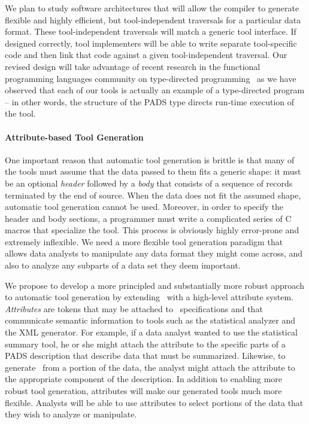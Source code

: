 \documentclass[11pt]{article}
\begin{document}
We plan to study software architectures that will allow the compiler to generate
flexible and highly efficient, but tool-independent traversals for a particular data format.  
These tool-independent traversals will match a generic tool interface.  If designed correctly, 
tool implementers will be able to write separate tool-specific code and then link that code
against a given tool-independent traversal.  Our revised design will take advantage of
recent research in the functional programming languages community on type-directed 
programming~\cite{crary+:intensional-types,LPJ03,syb2,SYB3}
as we have observed that each of our tools is actually an example 
of a type-directed program -- in other words, the structure of the PADS type directs run-time 
execution of the tool.

\paragraph*{Attribute-based Tool Generation}
One important reason that automatic tool generation is brittle
is that many of the tools must assume that the data passed to them fits a generic
shape: it must be an optional {\em header} followed by
a {\em body} that consists of a sequence of records 
terminated by the end of source.  
When the data does not fit the assumed shape, automatic
tool generation cannot be used.  Moreover, in order to specify 
the header and body sections, a programmer must write a complicated series of
C macros that specialize the tool.  This process is obviously highly 
error-prone and extremely inflexible.  We need a more flexible 
tool generation paradigm that allows data analysts to manipulate
any data format they might come across, and also to
analyze any subparts of a data set they deem important.

We propose to develop a more principled and substantially more robust
approach to automatic tool generation by extending \pads{}\ with a
high-level attribute system.  {\em Attributes} are tokens that may be
attached to \pads{}\ specifications and that communicate semantic
information to tools such as the statistical analyzer and the XML generator.  
For example, if a data analyst wanted to use the statistical
summary tool, he or she might attach the {} attribute to
the specific parts of a PADS description that describe data that must
be summarized.  Likewise, to generate \xml{}\ from a portion of the
data, the analyst might attach the {} attribute to the
appropriate component of the \pads{} description.  In addition to
enabling more robust tool generation, attributes will make our
generated tools much more flexible.  Analysts will be able to use
attributes to select portions of the data that they wish to analyze or
manipulate.
\end{document}
